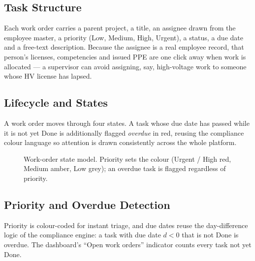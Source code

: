 \documentclass[11pt]{article}
\begin{document}
\subsection{Task Structure}
Each work order carries a parent project, a title, an assignee drawn from the employee master, a priority
(\textsf{Low}, \textsf{Medium}, \textsf{High}, \textsf{Urgent}), a status, a due date and a free-text
description. Because the assignee is a real employee record, that person's licenses, competencies and
issued PPE are one click away when work is allocated --- a supervisor can avoid assigning, say,
high-voltage work to someone whose HV license has lapsed.

\subsection{Lifecycle and States}
A work order moves through four states. A task whose due date has passed while it is not yet
\textsf{Done} is additionally flagged \emph{overdue} in red, reusing the compliance colour language so
attention is drawn consistently across the whole platform.

\begin{figure}[H]
\centering
{}
\caption{Work-order state model. Priority sets the colour (Urgent / High red, Medium amber, Low grey);
an overdue task is flagged regardless of priority.}
\end{figure}

\subsection{Priority and Overdue Detection}
Priority is colour-coded for instant triage, and due dates reuse the day-difference logic of the
compliance engine: a task with due date $d < 0$ that is not \textsf{Done} is overdue. The dashboard's
``Open work orders'' indicator counts every task not yet \textsf{Done}.
\end{document}
